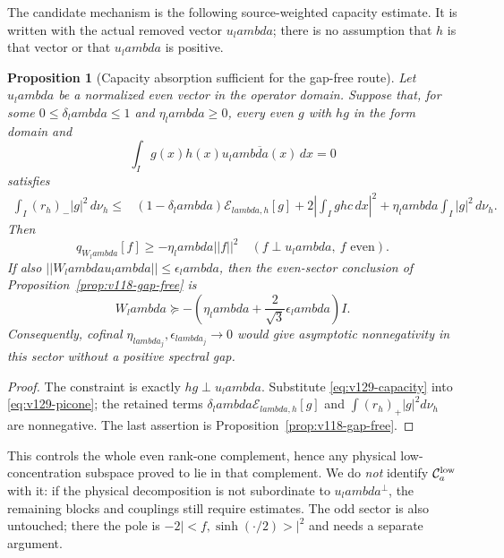 \documentclass[11pt]{article}
\def\lambda{lambda}%
\def\norm#1{||#1||}%
\def\ip#1#2{<#1,#2>}%
\newtheorem{proposition}[theorem]{Proposition}
\theoremstyle{remark}
\newcommand{\norm}[1]{\left\lVert #1\right\rVert}
\newcommand{\ip}[2]{\left\langle #1,#2\right\rangle}
\begin{document}
The candidate mechanism is the following source-weighted capacity
estimate. It is written with the actual removed vector $u_\lambda$;
there is no assumption that $h$ is that vector or that $u_\lambda$ is
positive.

\begin{proposition}[Capacity absorption sufficient for the gap-free route]
\label{prop:v129-capacity}
Let $u_\lambda$ be a normalized even vector in the operator domain.
Suppose that, for some $0\le\delta_\lambda\le1$ and
$\eta_\lambda\ge0$, every even $g$ with $hg$ in the form domain and
\begin{equation}\label{eq:v129-constraint}
 \int_I g(x)h(x)\overline{u_\lambda(x)}\,dx=0
\end{equation}
satisfies
\begin{align}
 \int_I(r_h)_-|g|^2\,d\nu_h
 \le{}&(1-\delta_\lambda)\mathcal E_{\lambda,h}[g]
 +2\left|\int_I ghc\,dx\right|^2
 +\eta_\lambda\int_I|g|^2\,d\nu_h .
 \label{eq:v129-capacity}
\end{align}
Then
\[
 q_{W_\lambda}[f]\ge-\eta_\lambda\norm f^2
 \quad(f\perp u_\lambda,\ f\text{ even}).
\]
If also $\norm{W_\lambda u_\lambda}\le\epsilon_\lambda$, then the
even-sector conclusion of Proposition~\ref{prop:v118-gap-free} is
\begin{equation}\label{eq:v129-gapfree-conclusion}
 W_\lambda\succeq-\left(\eta_\lambda+\frac{2}{\sqrt3}
 \epsilon_\lambda\right)I.
\end{equation}
Consequently, cofinal $\eta_{\lambda_j},\epsilon_{\lambda_j}\to0$
would give asymptotic nonnegativity in this sector without a positive
spectral gap.
\end{proposition}
\begin{proof}
The constraint is exactly $hg\perp u_\lambda$. Substitute
\eqref{eq:v129-capacity} into \eqref{eq:v129-picone}; the retained
terms $\delta_\lambda\mathcal E_{\lambda,h}[g]$ and
$\int(r_h)_+|g|^2d\nu_h$ are nonnegative. The last assertion is
Proposition~\ref{prop:v118-gap-free}.
\end{proof}

This controls the whole even rank-one complement, hence any physical
low-concentration subspace proved to lie in that complement. We do
\emph{not} identify $\mathcal C_a^{\rm low}$ with it: if the physical
decomposition is not subordinate to $u_\lambda^\perp$, the remaining
blocks and couplings still require estimates. The odd sector is also
untouched; there the pole is
$-2|\ip f{\sinh(\cdot/2)}|^2$ and needs a separate argument.
\end{document}
